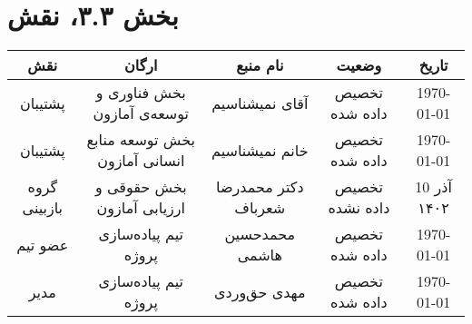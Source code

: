 \chapter{بخش ۳.۳، نقش\\}\label{roles}

\begin{table}[H]
\begin{adjustbox}{width=\textwidth}
\begin{tabular}{|c|c|c|c|c|}
\hline
نقش &
ارگان &
نام منبع &
وضعیت &
تاریخ \\
\hline
\hline
پشتیبان&
بخش فناوری و توسعه‌ی آمازون &
آقای نمیشناسیم &
تخصیص داده شده &
\today\\
\hline
پشتیبان&
بخش توسعه منابع انسانی آمازون &
خانم نمیشناسیم &
تخصیص داده شده &
\today\\
\hline
گروه بازبینی &
بخش حقوقی و ارزیابی آمازون &
دکتر محمدرضا شعرباف &
تخصیص داده نشده &
10 آذر ۱۴۰۲\\
\hline
عضو تیم &
تیم پیاده‌سازی پروژه &
محمدحسین هاشمی&
تخصیص داده شده&
\today\\
\hline
مدیر &
تیم پیاده‌سازی پروژه &
مهدی حق‌وردی&
تخصیص داده شده&
\today\\
\hline
\end{tabular}
\end{adjustbox}
\end{table}
